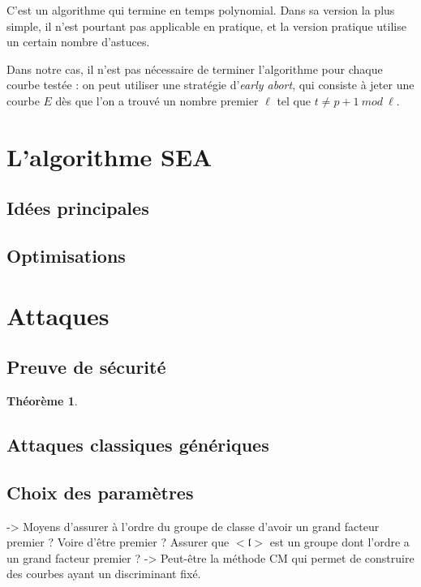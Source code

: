 \documentclass[11pt,a4paper]{article}
\renewcommand{\frak}{\mathfrak}
\newtheorem{thm}{Théorème}[subsection]
\theoremstyle{definition}
\begin{document}
C'est un algorithme qui termine en temps polynomial. Dans sa version la plus simple, il n'est pourtant pas applicable en pratique, et la version pratique utilise un certain nombre d'astuces.

Dans notre cas, il n'est pas nécessaire de terminer l'algorithme pour chaque courbe testée : on peut utiliser une stratégie d'\emph{early abort}, qui consiste à jeter une courbe $E$ dès que l'on a trouvé un nombre premier $\ell$ tel que $t\neq p+1\ mod\ \ell.$

\newpage

\section{L'algorithme SEA}

\subsection{Idées principales}

\subsection{Optimisations}


\newpage

\section{Attaques}


\subsection{Preuve de sécurité}


\begin{thm}

\end{thm}


\subsection{Attaques classiques génériques}


\subsection{Choix des paramètres}

-> Moyens d'assurer à l'ordre du groupe de classe d'avoir un grand facteur premier ? Voire d'être premier ? Assurer que $<\frak l>$ est un groupe dont l'ordre a un grand facteur premier ?
-> Peut-être la méthode CM qui permet de construire des courbes ayant un discriminant fixé.
\end{document}
